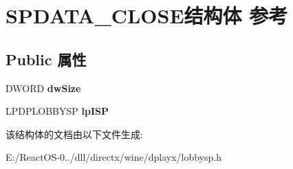 \hypertarget{struct_s_p_d_a_t_a___c_l_o_s_e}{}\section{S\+P\+D\+A\+T\+A\+\_\+\+C\+L\+O\+S\+E结构体 参考}
\label{struct_s_p_d_a_t_a___c_l_o_s_e}
\subsection*{Public 属性}
\begin{DoxyCompactItemize}
\item 
\mbox{\label{struct_s_p_d_a_t_a___c_l_o_s_e_ad4b3c8d4c9a976b3ceb3f0b24ada80c6}} 
D\+W\+O\+RD {\bfseries dw\+Size}
\item 
\mbox{\label{struct_s_p_d_a_t_a___c_l_o_s_e_a106fbe388fadc6c2208255fd11878591}} 
L\+P\+D\+P\+L\+O\+B\+B\+Y\+SP {\bfseries lp\+I\+SP}
\end{DoxyCompactItemize}


该结构体的文档由以下文件生成\+:\begin{DoxyCompactItemize}
\item 
E\+:/\+React\+O\+S-\/0../dll/directx/wine/dplayx/lobbysp.\+h\end{DoxyCompactItemize}
